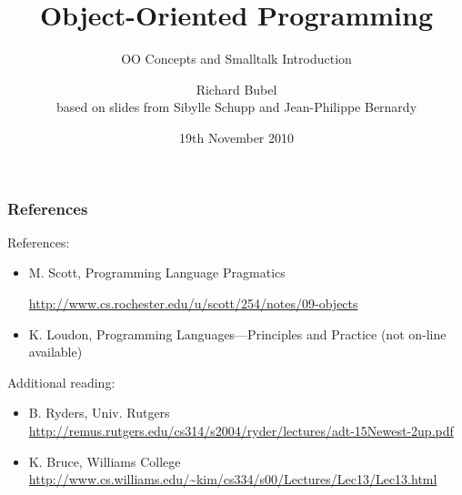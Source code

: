 \documentclass{beamer}
\title[OOP - OO Concepts and Smalltalk]{Object-Oriented
  Programming}
\subtitle[Concepts and Smalltalk]{OO Concepts and Smalltalk Introduction} %
\author[Richard Bubel] %
{Richard Bubel \\ based on slides from Sibylle Schupp and Jean-Philippe Bernardy}
\institute[CTH]{Chalmers University of Technology}
\date{19th November 2010}%
\begin{document}
\begin{frame}
  \titlepage
\end{frame}

\begin{frame}[fragile]
\frametitle{References}
References:
\begin{itemize}
\item M. Scott, Programming Language Pragmatics

\url{http://www.cs.rochester.edu/u/scott/254/notes/09-objects}
\item K. Loudon, Programming Languages---Principles and Practice
(not on-line available)
\end{itemize}

Additional reading:
\begin{itemize}
\item B. Ryders, Univ. Rutgers
\url{
http://remus.rutgers.edu/cs314/s2004/ryder/lectures/adt-15Newest-2up.pdf
}
%
\item K. Bruce, Williams College
\url{
http://www.cs.williams.edu/~kim/cs334/s00/Lectures/Lec13/Lec13.html}
\end{itemize}
\end{frame}

\end{document}
